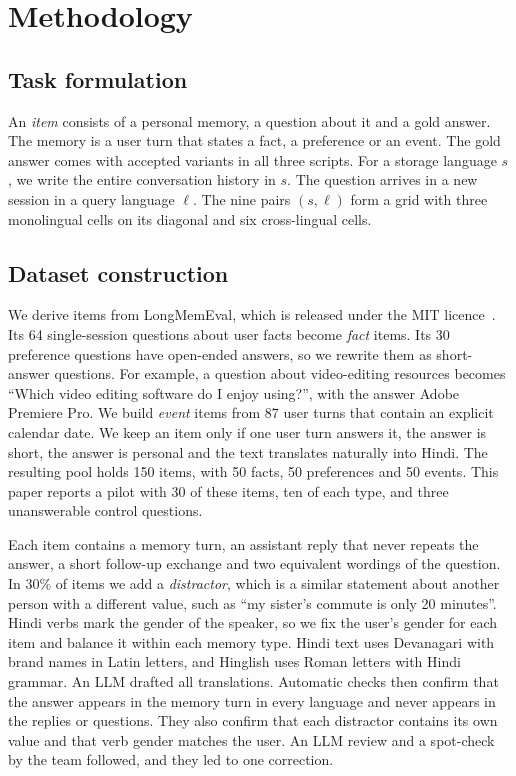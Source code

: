 \documentclass[11pt]{article}
\begin{document}
\section{Methodology}
\label{sec:method}

\subsection{Task formulation}
An \emph{item} consists of a personal memory, a question about it and a gold answer.
The memory is a user turn that states a fact, a preference or an event.
The gold answer comes with accepted variants in all three scripts.
For a storage language $s$, we write the entire conversation history in $s$.
The question arrives in a new session in a query language $\ell$.
The nine pairs $(s,\ell)$ form a grid with three monolingual cells on its diagonal and six cross-lingual cells.

\subsection{Dataset construction}
We derive items from LongMemEval, which is released under the MIT licence~\citep{wu2025longmemeval}.
Its 64 single-session questions about user facts become \emph{fact} items.
Its 30 preference questions have open-ended answers, so we rewrite them as short-answer questions.
For example, a question about video-editing resources becomes ``Which video editing software do I enjoy using?'', with the answer Adobe Premiere Pro.
We build \emph{event} items from 87 user turns that contain an explicit calendar date.
We keep an item only if one user turn answers it, the answer is short, the answer is personal and the text translates naturally into Hindi.
The resulting pool holds 150 items, with 50 facts, 50 preferences and 50 events.
This paper reports a pilot with 30 of these items, ten of each type, and three unanswerable control questions.

Each item contains a memory turn, an assistant reply that never repeats the answer, a short follow-up exchange and two equivalent wordings of the question.
In 30\% of items we add a \emph{distractor}, which is a similar statement about another person with a different value, such as ``my sister's commute is only 20 minutes''.
Hindi verbs mark the gender of the speaker, so we fix the user's gender for each item and balance it within each memory type.
Hindi text uses Devanagari with brand names in Latin letters, and Hinglish uses Roman letters with Hindi grammar.
An LLM drafted all translations.
Automatic checks then confirm that the answer appears in the memory turn in every language and never appears in the replies or questions.
They also confirm that each distractor contains its own value and that verb gender matches the user.
An LLM review and a spot-check by the team followed, and they led to one correction.
\end{document}
